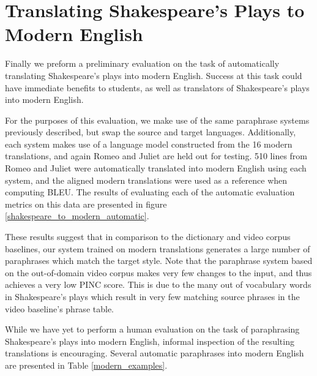 \documentclass[10pt,a5paper,twoside]{article}
\begin{document}
\section{Translating Shakespeare's Plays to Modern English}
Finally we preform a preliminary evaluation on the task of automatically translating Shakespeare's plays into modern English.  Success at this task could have immediate
benefits to students, as well as translators of Shakespeare's plays into modern English. 

For the purposes of this evaluation, 
we make use of the same paraphrase systems previously described, but swap the source and target languages.
Additionally, each system makes use of a language model constructed from the 16 modern translations, and again Romeo and Juliet are held out for testing.  
510 lines from Romeo and Juliet were automatically translated into modern English using each system, and the aligned modern 
translations were used as a reference when computing BLEU.  The results of evaluating each of the automatic evaluation metrics on this
data are presented in figure \ref{shakespeare_to_modern_automatic}.  

These results suggest that in comparison to the dictionary and video corpus baselines, 
our system trained on modern translations generates a large number of paraphrases which match the target style.
Note that the paraphrase system 
based on the out-of-domain video corpus makes very few changes to the input, and thus achieves a very low PINC score.  This is due to the many out of
vocabulary words in Shakespeare's plays which result in very few matching source phrases in the video baseline's phrase table.

While we have yet to perform a human evaluation on the task of paraphrasing Shakespeare's plays into modern English, 
informal inspection of the resulting translations is encouraging.  Several automatic paraphrases into modern English are presented in Table \ref{modern_examples}.
\end{document}
